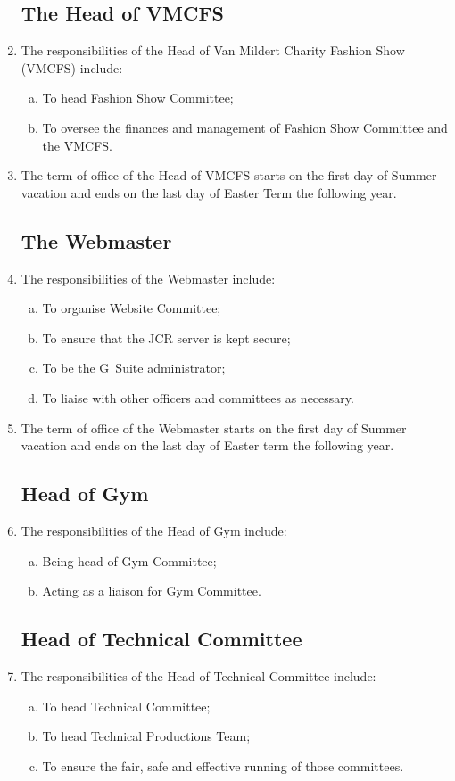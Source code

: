 \documentclass[12pt]{article}
\begin{document}
\begin{enumerate}
    \subsection{The Head of VMCFS}
    \item The responsibilities of the Head of Van Mildert Charity Fashion Show (VMCFS) include:
    \begin{enumerate}[(a)]
        \item To head Fashion Show Committee;
        \item To oversee the finances and management of Fashion Show Committee and the VMCFS.
    \end{enumerate}
    \item The term of office of the Head of VMCFS starts on the first day of Summer vacation and ends on the last day of Easter Term the following year.

    \subsection{The Webmaster}
    \item The responsibilities of the Webmaster include:
    \begin{enumerate}[(a)]
        \item To organise Website Committee;
        \item To ensure that the JCR server is kept secure;
        \item To be the G~Suite administrator;
        \item To liaise with other officers and committees as necessary.
    \end{enumerate}
    \item The term of office of the Webmaster starts on the first day of Summer vacation and ends on the last day of Easter term the following year.

    \subsection{Head of Gym}
    \item The responsibilities of the Head of Gym include:
    \begin{enumerate}[(a)]
        \item Being head of Gym Committee;
        \item Acting as a liaison for Gym Committee.
    \end{enumerate}

    \subsection{Head of Technical Committee}
    \item The responsibilities of the Head of Technical Committee include:
    \begin{enumerate}[(a)]
        \item To head Technical Committee;
        \item To head Technical Productions Team;
        \item To ensure the fair, safe and effective running of those committees.
    \end{enumerate}


\end{enumerate}
\end{document}
